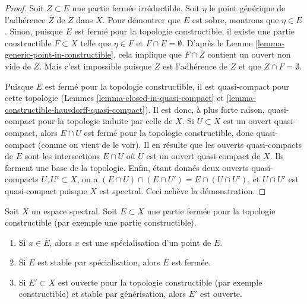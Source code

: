 \begin{proof}
Soit $Z \subset E$ une partie fermée irréductible. Soit $\eta$ le point
générique de l'adhérence $\overline{Z}$ de $Z$ dans $X$. Pour démontrer que
$E$ est sobre, montrons que $\eta \in E$. Sinon, puisque $E$ est fermé pour
la topologie constructible, il existe une partie constructible $F \subset X$
telle que $\eta \in F$ et $F \cap E = \emptyset$.
D'après le Lemme \ref{lemma-generic-point-in-constructible}, cela implique que
$F \cap \overline{Z}$ contient un ouvert non vide de $\overline{Z}$.
Mais c'est impossible puisque $\overline{Z}$ est l'adhérence de $Z$ et que
$Z \cap F = \emptyset$.

\medskip\noindent
Puisque $E$ est fermé pour la topologie constructible, il est quasi-compact
pour cette topologie
(Lemmes \ref{lemma-closed-in-quasi-compact} et
\ref{lemma-constructible-hausdorff-quasi-compact}). Il est donc, à plus forte
raison, quasi-compact pour la topologie induite par celle de $X$. Si
$U \subset X$ est un ouvert quasi-compact, alors $E \cap U$ est fermé pour la
topologie constructible, donc quasi-compact (comme on vient de le voir). Il en
résulte que les ouverts quasi-compacts de $E$ sont les intersections $E \cap U$
où $U$ est un ouvert quasi-compact de $X$. Ils forment une base de la topologie.
Enfin, étant donnés deux ouverts quasi-compacts $U, U' \subset X$, on a
$(E \cap U) \cap (E \cap U') = E \cap (U \cap U')$, et $U \cap U'$ est
quasi-compact puisque $X$ est spectral. Ceci achève la démonstration.
\end{proof}

\begin{lemma}
\label{lemma-constructible-stable-specialization-closed}
Soit $X$ un espace spectral. Soit $E \subset X$ une partie fermée pour la
topologie constructible (par exemple une partie constructible).
\begin{enumerate}
\item Si $x \in \overline{E}$, alors $x$ est une spécialisation d'un point de
$E$.
\item Si $E$ est stable par spécialisation, alors $E$ est fermée.
\item Si $E' \subset X$ est ouverte pour la topologie constructible
(par exemple constructible) et stable par générisation, alors $E'$ est ouverte.
\end{enumerate}
\end{lemma}

